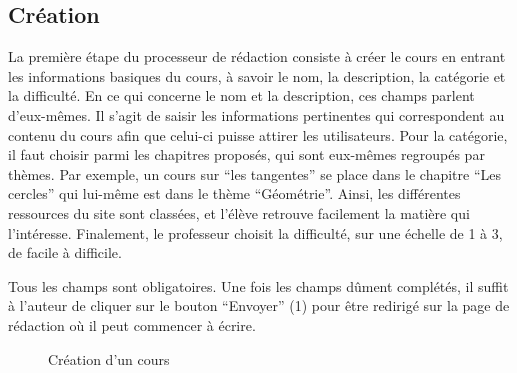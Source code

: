 \documentclass[a4paper,10pt,twoside]{sphinxmanual}
\begin{document}
\subsection{Création}
\label{functionalities:creation}
La première étape du processeur de rédaction consiste à créer le cours en entrant les informations basiques du cours, à savoir le nom, la description, la catégorie et la difficulté. En ce qui concerne le nom et la description, ces champs parlent d'eux-mêmes. Il s'agit de saisir les informations pertinentes qui correspondent au contenu du cours afin que celui-ci puisse attirer les utilisateurs. Pour la catégorie, il faut choisir parmi les chapitres proposés, qui sont eux-mêmes regroupés par thèmes. Par exemple, un cours sur ``les tangentes'' se place dans le chapitre ``Les cercles'' qui lui-même est dans le thème ``Géométrie''. Ainsi, les différentes ressources du site sont classées, et l'élève retrouve facilement la matière qui l'intéresse. Finalement, le professeur choisit la difficulté, sur une échelle de 1 à 3, de facile à difficile.

Tous les champs sont obligatoires. Une fois les champs dûment complétés, il suffit à l'auteur de cliquer sur le bouton ``Envoyer'' (1) pour être redirigé sur la page de rédaction où il peut commencer à écrire.
\begin{figure}[htbp]
\centering
\capstart

\caption{Création d'un cours}\end{figure}
\end{document}
